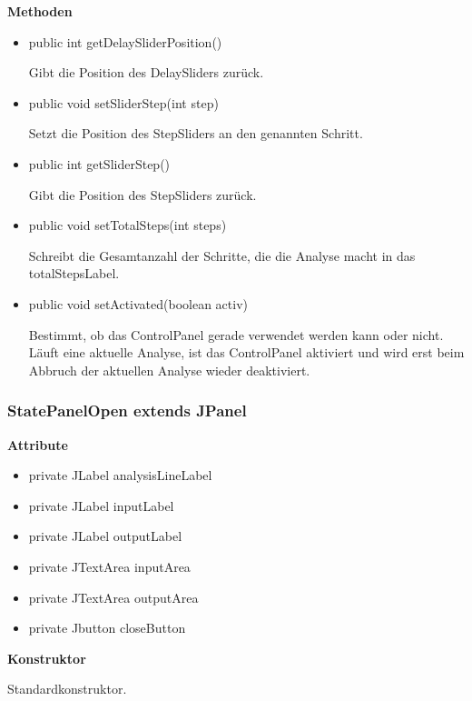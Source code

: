 \textbf{Methoden}
\begin{itemize}
	\item public int getDelaySliderPosition()\par
		Gibt die Position des DelaySliders zurück.
	\item public void setSliderStep(int step)\par
		Setzt die Position des StepSliders an den genannten Schritt.
	\item public int getSliderStep()\par
		Gibt die Position des StepSliders zurück.
	\item public void setTotalSteps(int steps)\par
		Schreibt die Gesamtanzahl der Schritte, die die Analyse macht in das totalStepsLabel.
	\item public void setActivated(boolean activ)\par
		Bestimmt, ob das ControlPanel gerade verwendet werden kann oder nicht. Läuft eine aktuelle Analyse, ist das ControlPanel aktiviert und wird erst beim Abbruch der aktuellen Analyse 		
		wieder deaktiviert.
\end{itemize}

\subsubsection{StatePanelOpen extends JPanel}
\textbf{Attribute}
\begin{itemize}
	\item private JLabel analysisLineLabel
	\item private JLabel inputLabel
	\item private JLabel outputLabel
	\item private JTextArea inputArea
	\item private JTextArea outputArea
	\item private Jbutton closeButton
\end{itemize}

\textbf{Konstruktor}\par
Standardkonstruktor.


